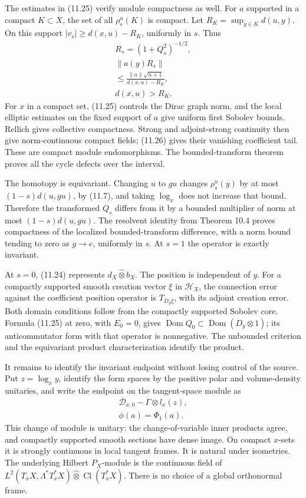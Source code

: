 \documentclass[
  11pt,
]{article}
\begin{document}
The estimates in (11.25) verify module compactness as well. For \(a\)
supported in a compact \(K\subset X\), the set of all \(\rho_s^u(K)\) is
compact. Let \(R_K=\sup_{y\in K}d(u,y)\). On this support
\(|v_s|\geq d(x,u)-R_K\), uniformly in \(s\). Thus \[
\begin{gathered}
R_s=(1+Q_s^2)^{-1/2},\\
\|a(y)R_s\|\\
\leq\frac{\|a\|\sqrt{n+1}}{d(x,u)-R_K},\\
d(x,u)>R_K.
\end{gathered}
\tag{11.26}
\] For \(x\) in a compact set, (11.25) controls the Dirac graph norm,
and the local elliptic estimates on the fixed support of \(a\) give
uniform first Sobolev bounds. Rellich gives collective compactness.
Strong and adjoint-strong continuity then give norm-continuous compact
fields; (11.26) gives their vanishing coefficient tail. These are
compact module endomorphisms. The bounded-transform theorem proves all
the cycle defects over the interval.

The homotopy is equivariant. Changing \(u\) to \(gu\) changes
\(\rho_s^u(y)\) by at most \((1-s)d(u,gu)\), by (11.7), and taking
\(\log_x\) does not increase that bound. Therefore the transformed
\(Q_s\) differs from it by a bounded multiplier of norm at most
\((1-s)d(u,gu)\). The resolvent identity from Theorem 10.4 proves
compactness of the localized bounded-transform difference, with a norm
bound tending to zero as \(g\to e\), uniformly in \(s\). At \(s=1\) the
operator is exactly invariant.

At \(s=0\), (11.24) represents \(d_X\widehat\otimes b_X\). The position
is independent of \(y\). For a compactly supported smooth creation
vector \(\xi\) in \(\mathcal H_X\), the connection error against the
coefficient position operator is \(T_{D_y\xi}\), with its adjoint
creation error. Both domain conditions follow from the compactly
supported Sobolev core. Formula (11.25) at zero, with \(E_0=0\), gives
\(\operatorname{Dom}Q_0\subset\operatorname{Dom}(D_y\otimes1)\); its
anticommutator form with that operator is nonnegative. The unbounded
criterion and the equivariant product characterization identify the
product.

It remains to identify the invariant endpoint without losing control of
the source. Put \(z=\log_xy\), identify the form spaces by the positive
polar and volume-density unitaries, and write the endpoint on the
tangent-space module as \[
\begin{gathered}
\mathscr D_{x,0}-\Gamma\otimes l_x(z),\\
\phi(a)=\Phi_1(a).
\end{gathered}
\tag{11.27}
\] This change of module is unitary: the change-of-variable inner
products agree, and compactly supported smooth sections have dense
image. On compact \(x\)-sets it is strongly continuous in local tangent
frames. It is natural under isometries. The underlying Hilbert
\(P_X\)-module is the continuous field of
\(L^2(T_xX,\Lambda^*T_x^*X)\widehat\otimes\operatorname{Cl}(T_x^*X)\).
There is no choice of a global orthonormal frame.
\end{document}
